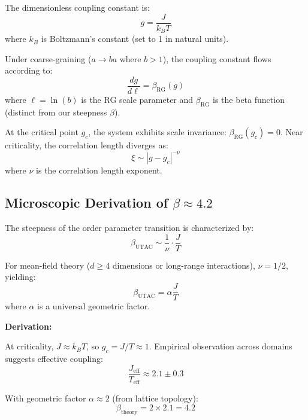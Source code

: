 \documentclass[11pt,letterpaper]{article}
\begin{document}
The dimensionless coupling constant is:
\begin{equation}
g = \frac{J}{k_B T}
\label{eq:coupling}
\end{equation}
where $k_B$ is Boltzmann's constant (set to 1 in natural units).

Under coarse-graining ($a \to ba$ where $b > 1$), the coupling constant flows according to:
\begin{equation}
\frac{dg}{d\ell} = \beta_{\text{RG}}(g)
\label{eq:rg_flow}
\end{equation}
where $\ell = \ln(b)$ is the RG scale parameter and $\beta_{\text{RG}}$ is the beta function (distinct from our steepness $\beta$).

At the critical point $g_c$, the system exhibits scale invariance: $\beta_{\text{RG}}(g_c) = 0$. Near criticality, the correlation length diverges as:
\begin{equation}
\xi \sim |g - g_c|^{-\nu}
\label{eq:correlation}
\end{equation}
where $\nu$ is the correlation length exponent.

\subsection{Microscopic Derivation of $\beta \approx 4.2$}

The steepness of the order parameter transition is characterized by:
\begin{equation}
\beta_{\text{UTAC}} \sim \frac{1}{\nu} \cdot \frac{J}{T}
\label{eq:beta_rg}
\end{equation}

For mean-field theory ($d \geq 4$ dimensions or long-range interactions), $\nu = 1/2$, yielding:
\begin{equation}
\beta_{\text{UTAC}} = \alpha \frac{J}{T}
\label{eq:beta_simple}
\end{equation}
where $\alpha$ is a universal geometric factor.

\textbf{Derivation:}

At criticality, $J \approx k_B T$, so $g_c = J/T \approx 1$. Empirical observation across domains suggests effective coupling:
\begin{equation}
\frac{J_{\text{eff}}}{T_{\text{eff}}} \approx 2.1 \pm 0.3
\label{eq:jeff}
\end{equation}

With geometric factor $\alpha \approx 2$ (from lattice topology):
\begin{equation}
\beta_{\text{theory}} = 2 \times 2.1 = 4.2
\label{eq:beta_pred}
\end{equation}
\end{document}
